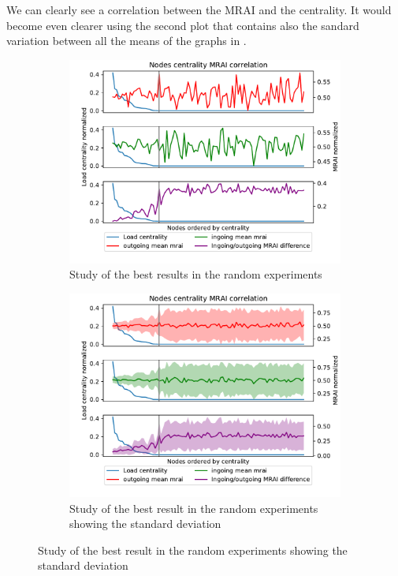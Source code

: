 \documentclass[10pt,conference,letterpaper]{IEEEtran}
\newcommand{\figwidth}{0.78}
\begin{document}
We can clearly see a correlation between the \ac{MRAI} and the centrality.
It would become even clearer using the second plot that contains also the sandard
variation between all the means of the graphs in .

\begin{figure}[tb]
	\centering

	\begin{subfigure}{\columnwidth}
		\centering
		\includegraphics[width=\figwidth\columnwidth]{images/internet_like/graph-100-random/random_study}
		\caption{Study of the best results in the random experiments}
		\label{fig:random_study_lines}
		\qquad
	\end{subfigure}

	\begin{subfigure}{\columnwidth}
		\centering
		\includegraphics[width=\figwidth\columnwidth]{images/internet_like/graph-100-random/random_study_std}
		\caption{Study of the best result in the random experiments showing the standard deviation}
		\label{fig:random_study_std}
		\qquad
	\end{subfigure}


\end{figure}
\end{document}
